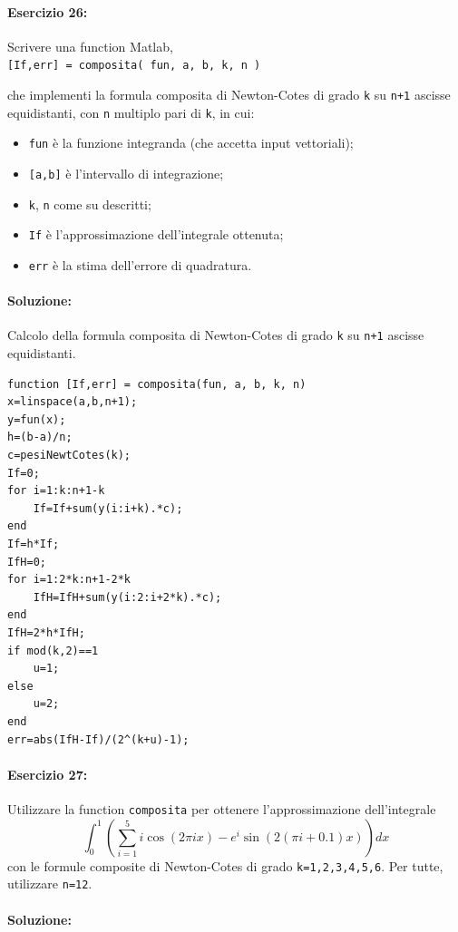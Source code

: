 \documentclass[12pt]{article}
\begin{document}
\paragraph{Esercizio 26:}
Scrivere una function Matlab, \\

\texttt{[If,err] = composita( fun, a, b, k, n )}

che implementi la formula composita di Newton-Cotes di grado \texttt{k} su \texttt{n+1} ascisse equidistanti, con \texttt{n}
multiplo pari di \texttt{k}, in cui:

\begin{itemize}
    \item \texttt{fun} è la funzione integranda (che accetta input vettoriali);
    \item \texttt{[a,b]} è l’intervallo di integrazione;
    \item \texttt{k}, \texttt{n} come su descritti;
    \item \texttt{If} è l’approssimazione dell’integrale ottenuta;
    \item \texttt{err} è la stima dell’errore di quadratura.
\end{itemize}
\paragraph{Soluzione:} Calcolo della formula composita di Newton-Cotes di grado \texttt{k} su \texttt{n+1} ascisse equidistanti.
\begin{lstlisting}[frame=single]
function [If,err] = composita(fun, a, b, k, n)
x=linspace(a,b,n+1);
y=fun(x);
h=(b-a)/n;
c=pesiNewtCotes(k);
If=0;
for i=1:k:n+1-k
    If=If+sum(y(i:i+k).*c);
end
If=h*If;
IfH=0;
for i=1:2*k:n+1-2*k
    IfH=IfH+sum(y(i:2:i+2*k).*c);
end
IfH=2*h*IfH;
if mod(k,2)==1
    u=1;
else
    u=2;
end
err=abs(IfH-If)/(2^(k+u)-1);
\end{lstlisting}



\paragraph{Esercizio 27:}
Utilizzare la function \texttt{composita} per ottenere l’approssimazione dell’integrale\\
$$\int_{0}^{1}(\sum_{i=1}^{5}i\cos(2\pi{ix})-e^{i}\sin(2(\pi{i}+0.1)x))dx$$
con le formule composite di Newton-Cotes di grado \texttt{k=1,2,3,4,5,6}. Per tutte, utilizzare \texttt{n=12}.
\paragraph{Soluzione:}
\end{document}
